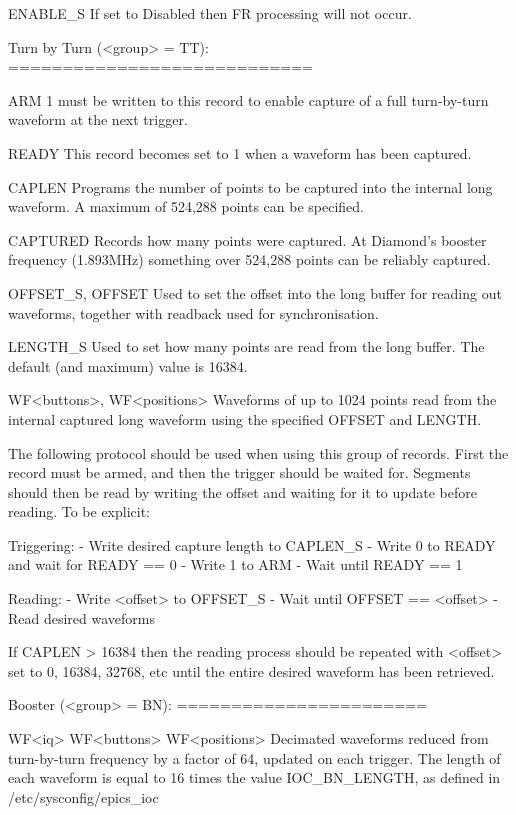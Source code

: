 \documentclass[a4paper,fleqn]{article}
\begin{document}
    ENABLE\_S
        If set to Disabled then FR processing will not occur.


Turn by Turn (<group> = TT):
============================

    ARM
        1 must be written to this record to enable capture of a full
        turn-by-turn waveform at the next trigger.

    READY
        This record becomes set to 1 when a waveform has been captured.

    CAPLEN
        Programs the number of points to be captured into the internal long
        waveform.  A maximum of 524,288 points can be specified.

    CAPTURED
        Records how many points were captured.  At Diamond's booster frequency
        (1.893MHz) something over 524,288 points can be reliably captured.

    OFFSET\_S, OFFSET
        Used to set the offset into the long buffer for reading out waveforms,
        together with readback used for synchronisation.

    LENGTH\_S
        Used to set how many points are read from the long buffer.  The
        default (and maximum) value is 16384.

    WF<buttons>, WF<positions>
        Waveforms of up to 1024 points read from the internal captured long
        waveform using the specified OFFSET and LENGTH.

The following protocol should be used when using this group of records.
First the record must be armed, and then the trigger should be waited for.
Segments should then be read by writing the offset and waiting for it to
update before reading.  To be explicit:

Triggering:
    - Write desired capture length to CAPLEN\_S
    - Write 0 to READY and wait for READY == 0
    - Write 1 to ARM
    - Wait until READY == 1

Reading:
    - Write <offset> to OFFSET\_S
    - Wait until OFFSET == <offset>
    - Read desired waveforms

If CAPLEN > 16384 then the reading process should be repeated with <offset>
set to 0, 16384, 32768, etc until the entire desired waveform has been
retrieved.


Booster (<group> = BN):
=======================

    WF<iq>
    WF<buttons>
    WF<positions>
        Decimated waveforms reduced from turn-by-turn frequency by a factor
        of 64, updated on each trigger.  The length of each waveform is equal
        to 16 times the value IOC\_BN\_LENGTH, as defined in
            /etc/sysconfig/epics\_ioc
\end{document}
